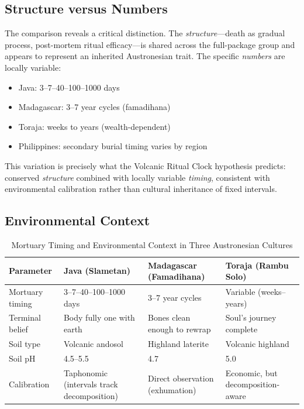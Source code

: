 \documentclass[12pt,a4paper]{article}
\begin{document}
\subsection{Structure versus Numbers}

The comparison reveals a critical distinction. The \textit{structure}---death as gradual process, post-mortem ritual efficacy---is shared across the full-package group and appears to represent an inherited Austronesian trait. The specific \textit{numbers} are locally variable:

\begin{itemize}[nosep]
\item Java: 3--7--40--100--1000 days
\item Madagascar: 3--7 year cycles (famadihana)
\item Toraja: weeks to years (wealth-dependent)
\item Philippines: secondary burial timing varies by region
\end{itemize}

This variation is precisely what the Volcanic Ritual Clock hypothesis predicts: conserved \textit{structure} combined with locally variable \textit{timing}, consistent with environmental calibration rather than cultural inheritance of fixed intervals.

\subsection{Environmental Context}

\begin{table}[H]
\centering
\caption{Mortuary Timing and Environmental Context in Three Austronesian Cultures}
\label{tab:comparison}
\begin{tabularx}{\textwidth}{@{}lXXX@{}}
\toprule
\textbf{Parameter} & \textbf{Java (Slametan)} & \textbf{Madagascar (Famadihana)} & \textbf{Toraja (Rambu Solo)} \\
\midrule
Mortuary timing & 3--7--40--100--1000 days & 3--7 year cycles & Variable (weeks--years) \\
Terminal belief & Body fully one with earth & Bones clean enough to rewrap & Soul's journey complete \\
Soil type & Volcanic andosol & Highland laterite & Volcanic highland \\
Soil pH & 4.5--5.5 & 4.7 & 5.0 \\
Calibration & Taphonomic (intervals track decomposition) & Direct observation (exhumation) & Economic, but decomposition-aware \\
\bottomrule
\end{tabularx}
\end{table}
\end{document}
